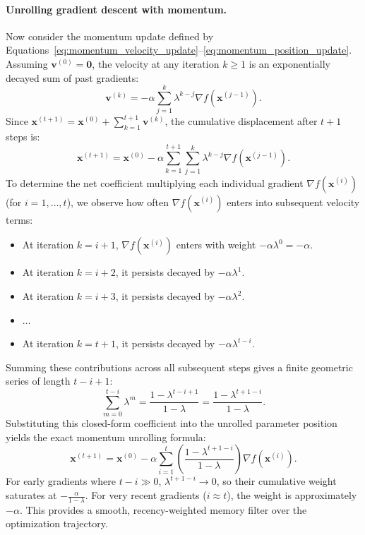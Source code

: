 \paragraph{Unrolling gradient descent with momentum.}
Now consider the momentum update defined by Equations~\eqref{eq:momentum_velocity_update}--\eqref{eq:momentum_position_update}. Assuming $\mathbf{v}^{(0)} = \mathbf{0}$, the velocity at any iteration $k \ge 1$ is an exponentially decayed sum of past gradients:
\begin{equation}
\mathbf{v}^{(k)} = -\alpha \sum_{j=1}^k \lambda^{k-j} \nabla f(\mathbf{x}^{(j-1)}).
\end{equation}
Since $\mathbf{x}^{(t+1)} = \mathbf{x}^{(0)} + \sum_{k=1}^{t+1} \mathbf{v}^{(k)}$, the cumulative displacement after $t+1$ steps is:
\begin{equation}
\mathbf{x}^{(t+1)} = \mathbf{x}^{(0)} - \alpha \sum_{k=1}^{t+1} \sum_{j=1}^k \lambda^{k-j} \nabla f(\mathbf{x}^{(j-1)}).
\end{equation}
To determine the net coefficient multiplying each individual gradient $\nabla f(\mathbf{x}^{(i)})$ (for $i = 1, \dots, t$), we observe how often $\nabla f(\mathbf{x}^{(i)})$ enters into subsequent velocity terms:
\begin{itemize}[noitemsep]
  \item At iteration $k = i+1$, $\nabla f(\mathbf{x}^{(i)})$ enters with weight $-\alpha \lambda^0 = -\alpha$.
  \item At iteration $k = i+2$, it persists decayed by $-\alpha \lambda^1$.
  \item At iteration $k = i+3$, it persists decayed by $-\alpha \lambda^2$.
  \item $\dots$
  \item At iteration $k = t+1$, it persists decayed by $-\alpha \lambda^{t-i}$.
\end{itemize}
Summing these contributions across all subsequent steps gives a finite geometric series of length $t - i + 1$:
\begin{equation}
\sum_{m=0}^{t-i} \lambda^m = \frac{1 - \lambda^{t-i+1}}{1 - \lambda} = \frac{1 - \lambda^{t+1-i}}{1 - \lambda}.
\end{equation}
Substituting this closed-form coefficient into the unrolled parameter position yields the exact momentum unrolling formula:
\begin{equation}
\mathbf{x}^{(t+1)} = \mathbf{x}^{(0)} - \alpha \sum_{i=1}^t \left( \frac{1 - \lambda^{t+1-i}}{1 - \lambda} \right) \nabla f(\mathbf{x}^{(i)}).
\label{eq:unrolled_momentum}
\end{equation}
For early gradients where $t - i \gg 0$, $\lambda^{t+1-i} \to 0$, so their cumulative weight saturates at $-\frac{\alpha}{1 - \lambda}$. For very recent gradients ($i \approx t$), the weight is approximately $-\alpha$. This provides a smooth, recency-weighted memory filter over the optimization trajectory.

